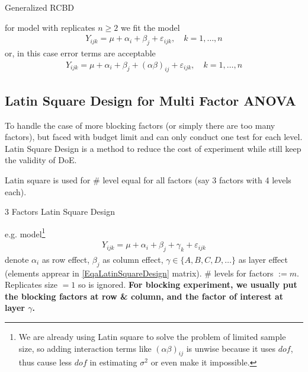 \begin{point}
    Generalized RCBD
\end{point}

for model with replicates $ n \geq 2 $ we fit the model
\begin{align*}
    Y_{ijk}=\mu +\alpha _i+\beta _j +\varepsilon _{ijk},\quad k=1,\ldots, n
\end{align*}
or, in this case error terms are acceptable
\begin{align*}
    Y_{ijk}=\mu +\alpha _i+\beta _j + (\alpha \beta )_{ij} +\varepsilon _{ijk},\quad k=1,\ldots, n
\end{align*}





\subsection{Latin Square Design for Multi Factor ANOVA}\label{SubSubSectionLatinSquareDesign}

To handle the case of more blocking factors (or simply there are too many factors), but faced with budget limit and can only conduct one test for each level. Latin Square Design is a method to reduce the cost of experiment while still keep the validity of DoE.

Latin square is used for \# level equal for all factors (say 3 factors with 4 levels each).

\begin{point}
    3 Factors Latin Square Design
\end{point}

e.g. model\footnote{We are already using Latin square to solve the problem of limited sample size, so adding interaction terms like $ (\alpha \beta )_{ij} $ is unwise because it uses $ dof $, thus cause less $ dof $ in estimating $ \sigma ^2 $ or even make it impossible.}
\begin{align}
    Y_{ijk}=\mu +\alpha _i+\beta _j+\gamma _k+\varepsilon _{ijk} 
\end{align}
denote $ \alpha _i $ as row effect, $ \beta _j $ as column effect, $ \gamma\in\{A,B,C,D,\ldots\} $ as layer effect (elements apprear in \autoref{EqaLatinSquareDesign} matrix). \# levels for factors $ := m $. Replicates size $ =1 $ so is ignored. \textbf{For blocking experiment, we usually put the blocking factors at row \& column, and the factor of interest at layer $ \gamma  $.}

